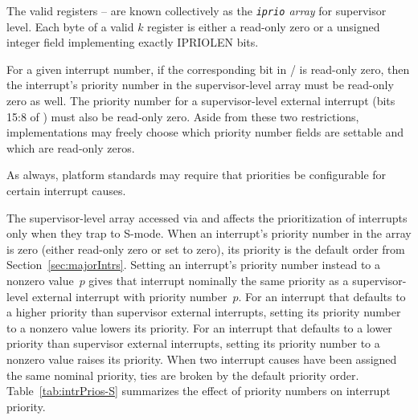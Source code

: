 The valid registers -- are known collectively as
the \emph{\texttt{iprio} array} for supervisor level.
Each byte of a valid $k$ register is either a read-only zero
or a {\WARL} unsigned integer field implementing exactly IPRIOLEN bits.

For a given interrupt number, if the corresponding bit in
/ is read-only zero, then the interrupt's priority
number in the supervisor-level  array must be read-only zero
as well.
The priority number for a supervisor-level external interrupt
(bits 15:8 of ) must also be read-only zero.
Aside from these two restrictions, implementations may freely choose
which priority number fields are settable and which are read-only
zeros.

\begin{commentary}
As always, platform standards may require that priorities be
configurable for certain interrupt causes.
\end{commentary}

The supervisor-level  array accessed via  and
 affects the prioritization of interrupts only when they trap
to \mbox{S-mode}.
When an interrupt's priority number in the array is zero (either
read-only zero or set to zero), its priority is the default order from
Section~\ref{sec:majorIntrs}.
Setting an interrupt's priority number instead to a nonzero value~$p$
gives that interrupt nominally the same priority as a supervisor-level
external interrupt with priority number~$p$.
For an interrupt that defaults to a higher priority than supervisor
external interrupts, setting its priority number to a nonzero value
lowers its priority.
For an interrupt that defaults to a lower priority than supervisor
external interrupts, setting its priority number to a nonzero value
raises its priority.
When two interrupt causes have been assigned the same nominal priority,
ties are broken by the default priority order.
Table~\ref{tab:intrPrios-S} summarizes the effect of priority numbers
on interrupt priority.

